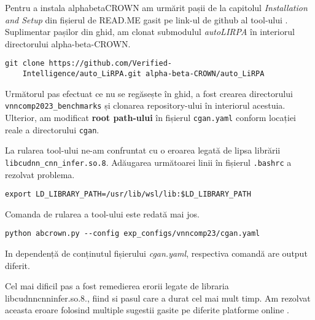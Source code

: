 \hspace{0.5 cm}
Pentru a instala alpha\textunderscore beta\textunderscore CROWN am urmărit pașii de la capitolul \textit{Installation and Setup} din fișierul de READ.ME gasit pe link-ul de github al tool-ului \cite{read_abc.md}. 
Suplimentar pașilor din ghid, am clonat submodulul \textit{auto\textunderscore LIRPA} în interiorul directorului alpha-beta-CROWN. 
    \begin{lstlisting}[style=bashstyle]
    git clone https://github.com/Verified-
    Intelligence/auto_LiRPA.git alpha-beta-CROWN/auto_LiRPA
   \end{lstlisting}

Următorul pas efectuat ce nu se regăsește în ghid, a fost crearea directorului \texttt{vnncomp2023\_benchmarks} și clonarea repository-ului \cite{cganrepository} în interiorul acestuia. Ulterior, am modificat \textbf{root path-ului} în fișierul \texttt{cgan.yaml} conform locației reale a directorului \texttt{cgan}.

La rularea tool-ului ne-am confruntat cu o eroarea legată de lipsa librării \texttt{libcudnn\_cnn\_infer.so.8}. Adăugarea următoarei linii în fișierul \texttt{.bashrc} a rezolvat problema.
  \begin{lstlisting}[style=bashstyle]
    export LD_LIBRARY_PATH=/usr/lib/wsl/lib:$LD_LIBRARY_PATH
  \end{lstlisting}
  
Comanda de rularea a tool-ului este redată mai jos.
  \begin{lstlisting}[style=bashstyle]
    python abcrown.py --config exp_configs/vnncomp23/cgan.yaml
  \end{lstlisting}
In dependență de conținutul fișierului \textit{cgan.yaml}, respectiva comandă are output diferit.

Cel mai dificil pas a fost remedierea erorii legate de libraria libcudnn\textunderscore cnn\textunderscore infer.so.8., fiind si pasul care a durat cel mai mult timp. Am rezolvat aceasta eroare folosind multiple sugestii gasite pe diferite platforme online \cite{bashrcfix}.